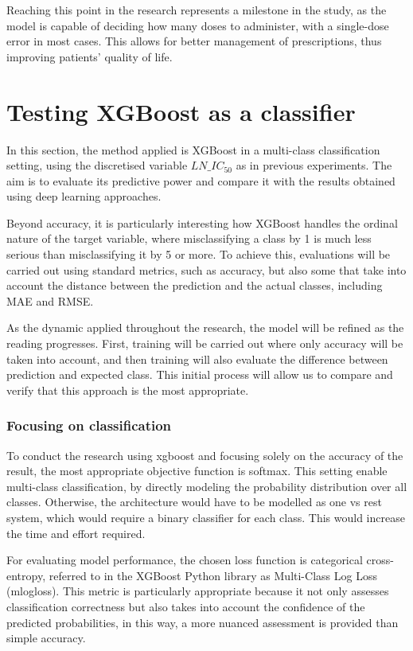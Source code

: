 Reaching this point in the research represents a milestone in the study, as the model is capable of deciding how many doses to administer, with a single-dose error in most cases. This allows for better management of prescriptions, thus improving patients' quality of life.

\section{Testing XGBoost as a classifier}

In this section, the method applied is XGBoost in a multi-class classification setting, using the discretised variable \(LN\_IC_{50}\) as in previous experiments. The aim is to evaluate its predictive power and compare it with the results obtained using deep learning approaches.

Beyond accuracy, it is particularly interesting how XGBoost handles the ordinal nature of the target variable, where misclassifying a class by 1 is much less serious than misclassifying it by 5 or more. To achieve this, evaluations will be carried out using standard metrics, such as accuracy, but also some that take into account the distance between the prediction and the actual classes, including MAE and RMSE.

As the dynamic applied throughout the research, the model will be refined as the reading progresses. First, training will be carried out where only accuracy will be taken into account, and then training will also evaluate the difference between prediction and expected class. This initial process will allow us to compare and verify that this approach is the most appropriate.

\subsubsection{Focusing on classification}

To conduct the research using xgboost and focusing solely on the accuracy of the result, the most appropriate objective function is softmax. This setting enable multi-class classification, by directly modeling the probability distribution over all classes. Otherwise, the architecture would have to be modelled as one vs rest system, which would require a binary classifier for each class. This would increase the time and effort required.

For evaluating model performance, the chosen loss function is categorical cross-entropy, referred to in the XGBoost Python library as Multi-Class Log Loss (mlogloss). This metric is particularly appropriate because it not only assesses classification correctness but also takes into account the confidence of the predicted probabilities, in this way, a more nuanced assessment is provided than simple accuracy.

